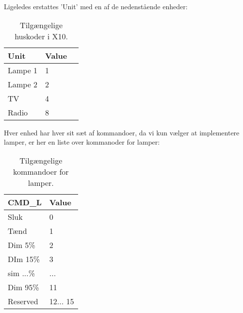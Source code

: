 Ligeledes erstattes 'Unit' med en af de nedenstående enheder:

\begin{table} [h]
\centering
    \begin{tabular}{|l|l|l|}
    \hline
    Unit    & Value   \\ \hline
    Lampe 1 & 1     \\ \hline
    Lampe 2 & 2      \\ \hline
    TV      & 4     \\ \hline
    Radio   & 8     \\ \hline
    \end{tabular}
\caption{Tilgængelige huskoder i X10.}
\end{table}

Hver enhed har hver sit sæt af kommandoer, da vi kun vælger at implementere lamper, er her en liste over kommanoder for lamper:

\begin{table} [h]
\centering
    \begin{tabular}{|l|l|}
    \hline
    CMD\_L    & Value    \\ \hline
    Sluk      & 0        \\ \hline
    Tænd      & 1        \\ \hline
    Dim 5\%   & 2        \\ \hline
    DIm 15\%  & 3        \\ \hline
    sim ...\% & ...      \\ \hline
    Dim 95\%  & 11       \\ \hline
    Reserved  & 12... 15 \\ \hline
    \end{tabular}
\caption{Tilgængelige kommandoer for lamper.}
\end{table}






